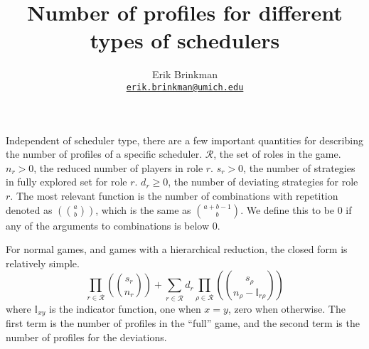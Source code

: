 \documentclass{article}
\newcommand{\reps}[2]{\left(\!\!{#1\choose #2}\!\!\right)}
\begin{document}
\title{Number of profiles for different types of schedulers}
\author{Erik Brinkman\\\texttt{\href{mailto:erik.brinkman@umich.edu}{erik.brinkman@umich.edu}}}
\maketitle

Independent of scheduler type, there are a few important quantities for describing the number of profiles of a specific scheduler.
$\mathcal R$, the set of roles in the game.
$n_r > 0$, the reduced number of players in role $r$.
$s_r > 0$, the number of strategies in fully explored set for role $r$.
$d_r \ge 0$, the number of deviating strategies for role $r$.
The most relevant function is the number of combinations with repetition denoted as $\reps{a}{b}$, which is the same as $a + b - 1 \choose b$.
We define this to be 0 if any of the arguments to combinations is below 0.

For normal games, and games with a hierarchical reduction, the closed form is relatively simple.
\begin{equation*}
    \prod_{r \in \mathcal R} \reps{s_r}{n_r} + \sum_{r \in \mathcal R} d_r \prod_{\rho \in \mathcal R} \reps{s_\rho}{n_\rho - \mathbb{I}_{r\rho}}
\end{equation*}
where $\mathbb{I}_{xy}$ is the indicator function, one when $x = y$, zero when otherwise.
The first term is the number of profiles in the ``full'' game, and the second term is the number of profiles for the deviations.
\end{document}
